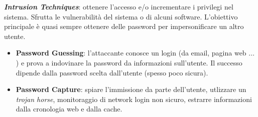 \documentclass[11pt, a4paper, twoside, italian]{report}
\theoremstyle{plain}
\begin{document}
\noindent
\textit{\textbf{Intrusion Techniques}}: ottenere l'accesso e/o incrementare i privilegi nel sistema. Sfrutta le vulnerabilità del sistema o di alcuni software. L'obiettivo principale è quasi sempre ottenere delle password per impersonificare un altro utente.
\begin{itemize}
	\item \textbf{Password Guessing}: l'attaccante conosce un login (da email, pagina web $\dots$) e prova a indovinare la password da informazioni sull'utente. Il successo dipende dalla password scelta dall'utente (spesso poco sicura).
	\item \textbf{Password Capture}: spiare l'immissione da parte dell'utente, utlizzare un \textit{trojan horse}, monitoraggio di network login non sicuro, estrarre informazioni dalla cronologia web e dalla cache.
\end{itemize}
\end{document}
